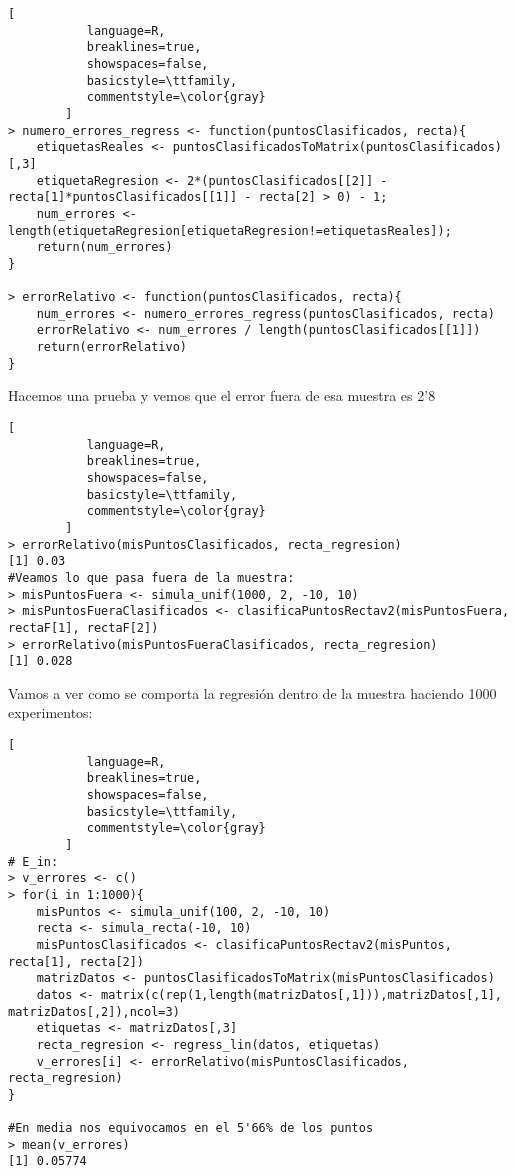 \documentclass[11pt,fleqn]{book} %
\begin{document}
\begin{lstlisting}[
           language=R,
           breaklines=true,
           showspaces=false,
           basicstyle=\ttfamily,
           commentstyle=\color{gray}
        ]    
> numero_errores_regress <- function(puntosClasificados, recta){
    etiquetasReales <- puntosClasificadosToMatrix(puntosClasificados)[,3]
    etiquetaRegresion <- 2*(puntosClasificados[[2]] - recta[1]*puntosClasificados[[1]] - recta[2] > 0) - 1;
    num_errores <- length(etiquetaRegresion[etiquetaRegresion!=etiquetasReales]);
    return(num_errores)
}
    
> errorRelativo <- function(puntosClasificados, recta){
    num_errores <- numero_errores_regress(puntosClasificados, recta)
    errorRelativo <- num_errores / length(puntosClasificados[[1]])
    return(errorRelativo)
}

\end{lstlisting}
Hacemos una prueba y vemos que el error fuera de esa muestra es 2'8%
\begin{lstlisting}[
           language=R,
           breaklines=true,
           showspaces=false,
           basicstyle=\ttfamily,
           commentstyle=\color{gray}
        ] 
> errorRelativo(misPuntosClasificados, recta_regresion)
[1] 0.03
#Veamos lo que pasa fuera de la muestra:
> misPuntosFuera <- simula_unif(1000, 2, -10, 10)
> misPuntosFueraClasificados <- clasificaPuntosRectav2(misPuntosFuera, rectaF[1], rectaF[2])
> errorRelativo(misPuntosFueraClasificados, recta_regresion)
[1] 0.028
\end{lstlisting}

Vamos a ver como se comporta la regresión dentro de la muestra haciendo 1000 experimentos:
\begin{lstlisting}[
           language=R,
           breaklines=true,
           showspaces=false,
           basicstyle=\ttfamily,
           commentstyle=\color{gray}
        ]    
# E_in:
> v_errores <- c()
> for(i in 1:1000){
    misPuntos <- simula_unif(100, 2, -10, 10)
    recta <- simula_recta(-10, 10)
    misPuntosClasificados <- clasificaPuntosRectav2(misPuntos, recta[1], recta[2])
    matrizDatos <- puntosClasificadosToMatrix(misPuntosClasificados)
    datos <- matrix(c(rep(1,length(matrizDatos[,1])),matrizDatos[,1], matrizDatos[,2]),ncol=3)
    etiquetas <- matrizDatos[,3]
    recta_regresion <- regress_lin(datos, etiquetas)
    v_errores[i] <- errorRelativo(misPuntosClasificados, recta_regresion)
}

#En media nos equivocamos en el 5'66% de los puntos
> mean(v_errores)
[1] 0.05774
\end{lstlisting}
\end{document}
